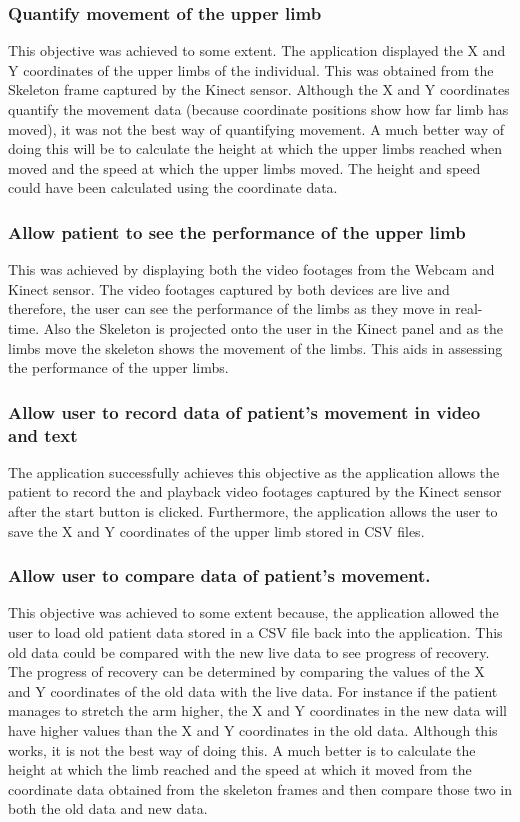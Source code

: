 \documentclass[a4paper, 12pt]{article}
\begin{document}
\subsubsection{Quantify movement of the upper limb}
This objective was achieved to some extent. The application displayed the X and Y coordinates of the upper limbs of the individual. This was obtained from the Skeleton frame captured by the Kinect sensor. Although the X and Y coordinates quantify the movement data (because coordinate positions show how far limb has moved), it was not the best way of quantifying movement. A much better way of doing this will be to calculate the height at which the upper limbs reached when moved and the speed at which the upper limbs moved. The height and speed could have been calculated using the coordinate data. 


\subsubsection{Allow patient to see the performance of the upper limb}
This was achieved by displaying both the video footages from the Webcam and Kinect sensor. The video footages captured by both devices are live and therefore, the user can see the performance of the limbs as they move in real-time. Also the Skeleton is projected onto the user in the Kinect panel and as the limbs move the skeleton shows the movement of the limbs. This aids in assessing the performance of the upper limbs. 

\subsubsection{Allow user to record data of patient's movement in video and text}
The application successfully achieves this objective as the application allows the patient to record the and playback video footages captured by the Kinect sensor after the start button is clicked. Furthermore, the application allows the user to save the X and Y coordinates of the upper limb stored in CSV files.  

\subsubsection{Allow user to compare data of patient’s movement.}
This objective was achieved to some extent because, the application allowed the user to load old patient data stored in a CSV file back into the application. This old data could be compared with the new live data to see progress of recovery. The progress of recovery can be determined by comparing the values of the X and Y coordinates of the old data with the live data. For instance if the patient manages to stretch the arm higher, the X and Y coordinates in the new data will have higher values than the X and Y coordinates in the old data. Although this works, it is not the best way of doing this. A much better is to calculate the height at which the limb reached and the speed at which it moved from the coordinate data obtained from the skeleton frames and then compare those two in both the old data and new data.
\end{document}
